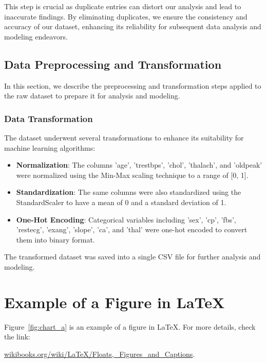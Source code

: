  This step is crucial as duplicate entries can distort our analysis and lead to inaccurate findings. By eliminating duplicates, we ensure the consistency and accuracy of our dataset, enhancing its reliability for subsequent data analysis and modeling endeavors.
\subsection{Data Preprocessing and Transformation}

In this section, we describe the preprocessing and transformation steps applied to the raw dataset to prepare it for analysis and modeling.


\subsubsection{Data Transformation}

The dataset underwent several transformations to enhance its suitability for machine learning algorithms:

\begin{itemize}
    \item \textbf{Normalization}: The columns 'age', 'trestbps', 'chol', 'thalach', and 'oldpeak' were normalized using the Min-Max scaling technique to a range of [0, 1].
    
    \item \textbf{Standardization}: The same columns were also standardized using the StandardScaler to have a mean of 0 and a standard deviation of 1.
    
    \item \textbf{One-Hot Encoding}: Categorical variables including 'sex', 'cp', 'fbs', 'restecg', 'exang', 'slope', 'ca', and 'thal' were one-hot encoded to convert them into binary format.
\end{itemize}

The transformed dataset was saved into a single CSV file for further analysis and modeling.


\section{Example of a Figure in \LaTeX}
Figure~\ref{fig:chart_a} is an example of a figure in \LaTeX. For more details, check the link:

\href{https://en.wikibooks.org/wiki/LaTeX/Floats,_Figures_and_Captions}{wikibooks.org/wiki/LaTeX/Floats,\_Figures\_and\_Captions}.

